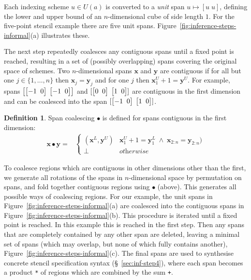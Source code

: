 \documentclass[10pt,preprint]{sigplanconf}
\newcounter{block}
\theoremstyle{definition}
\newtheorem{definition}[block]{Definition}
\newcommand{\vect}[1]{\textbf{#1}}
\newcommand{\vtwoh}[2]{\setlength{\arraycolsep}{0em}
\left[\begin{array}{cc}#1 \; & \; #2\end{array}\right]}
\begin{document}
\noindent
Each indexing scheme $u \in U(a)$ is converted to a \emph{unit} span
$u \mapsto [u \; u]$, defining the lower and upper bound of an
$n$-dimensional cube of side length $1$.  For the five-point stencil
example there are five unit spans.
Figure~\ref{fig:inference-steps-informal}(a) illustrates these.

The next step repeatedly coalesces any contiguous spans until a fixed
point is reached, resulting in a set of (possibly overlapping) spans
covering the original space of schemes. Two $n$-dimensional spans
$\vect{x}$ and $\vect{y}$ are contiguous if for all but one
$j \in \{1, \ldots, n\}$ then $\vect{x}_j = \vect{y}_j$ and for one
$j$ then $\vect{x}^U_1 + 1 = \vect{y}^U$. For example, spans
$\left[\vtwoh{-1}{0}\; \vtwoh{-1}{0}\right]$ and
$[\vtwoh{0}{0} \; \vtwoh{1}{0}]$ are contiguous in the first dimension
and can be coalesced into the span $[\vtwoh{-1}{0} \; \vtwoh{1}{0}]$.

\begin{definition}\label{def:span-coalesc}
  Span coalescing $\bullet$ is defined for spans contiguous in the
  first dimension:
\begin{align*}
\vect{x} \bullet \vect{y}
= &
\begin{cases}
(\vect{x}^L, \vect{y}^U) & \vect{x}^U_1 + 1 = \vect{y}^L_1 \; \wedge \;
\vect{x}_{2:n} = \vect{y}_{2:n}) \\
\bot  & \textit{otherwise}
\end{cases}
\end{align*}
\end{definition}
\noindent
To coalesce regions which are contiguous in other dimensions
other than the first, we generate all rotations of the spans in
$n$-dimensional space by permutation on spans, and fold together contiguous
regions using $\bullet$ (above). This
generates all possible ways of coalescing regions. For our example,
the unit spans in Figure~\ref{fig:inference-steps-informal}(a)
are coalesced into the contiguous spans in
Figure~\ref{fig:inference-steps-informal}(b).
This procedure is iterated until a fixed point is reached. In this
example this is reached in the first step.
 Then any spans that are completely contained by any other span are deleted,
leaving a minimal set of spans (which may overlap, but none of which
fully contains another), Figure~\ref{fig:inference-steps-informal}(c).
The final spans are used to synthesise concrete stencil specification
syntax (\S~\ref{sec:inf-step4}), where
each span becomes a product \texttt{*} of regions which are
combined by the sum \texttt{+}.
\end{document}
